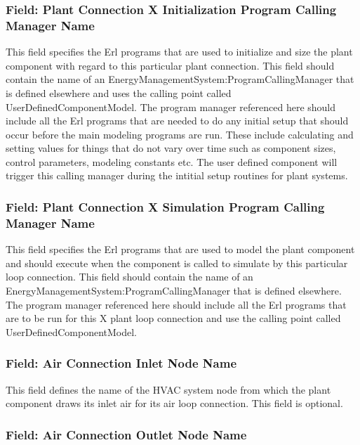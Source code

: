 \subsubsection{Field: Plant Connection X Initialization Program Calling Manager Name}\label{field-plant-connection-x-initialization-program-calling-manager-name}

This field specifies the Erl programs that are used to initialize and size the plant component with regard to this particular plant connection. This field should contain the name of an EnergyManagementSystem:ProgramCallingManager that is defined elsewhere and uses the calling point called UserDefinedComponentModel. The program manager referenced here should include all the Erl programs that are needed to do any initial setup that should occur before the main modeling programs are run. These include calculating and setting values for things that do not vary over time such as component sizes, control parameters, modeling constants etc. The user defined component will trigger this calling manager during the intitial setup routines for plant systems.

\subsubsection{Field: Plant Connection X Simulation Program Calling Manager Name}\label{field-plant-connection-x-simulation-program-calling-manager-name}

This field specifies the Erl programs that are used to model the plant component and should execute when the component is called to simulate by this particular loop connection. This field should contain the name of an EnergyManagementSystem:ProgramCallingManager that is defined elsewhere. The program manager referenced here should include all the Erl programs that are to be run for this X plant loop connection and use the calling point called UserDefinedComponentModel.

\subsubsection{Field: Air Connection Inlet Node Name}\label{field-air-connection-inlet-node-name}

This field defines the name of the HVAC system node from which the plant component draws its inlet air for its air loop connection. This field is optional.

\subsubsection{Field: Air Connection Outlet Node Name}\label{field-air-connection-outlet-node-name}

